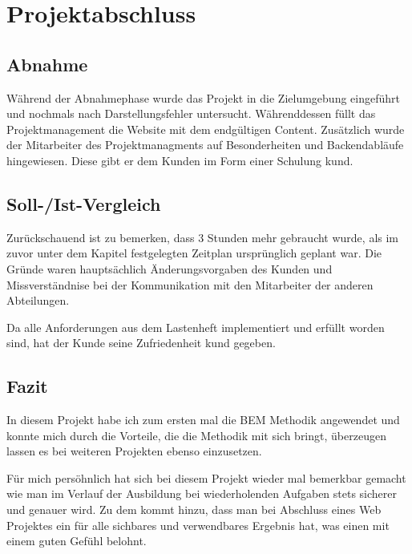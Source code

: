\section{Projektabschluss} 
\label{sec:Projektabschluss}

\subsection{Abnahme} 
\label{sec:Abnahme}
Während der Abnahmephase wurde das Projekt in die Zielumgebung eingeführt und
nochmals nach Darstellungsfehler untersucht. Währenddessen füllt das
Projektmanagement die Website mit dem endgültigen Content. Zusätzlich wurde der
Mitarbeiter des Projektmanagments auf Besonderheiten und Backendabläufe
hingewiesen. Diese gibt er dem Kunden im Form einer Schulung kund.

\subsection{Soll-/Ist-Vergleich}
\label{sec:SollIstVergleich}

Zurückschauend ist zu bemerken, dass 3 Stunden mehr gebraucht wurde,
als im zuvor unter dem Kapitel  festgelegten Zeitplan
ursprünglich geplant war.
Die Gründe waren hauptsächlich Änderungsvorgaben des Kunden und Missverständnise
bei der Kommunikation mit den Mitarbeiter der anderen Abteilungen. 


Da alle Anforderungen aus dem Lastenheft implementiert und erfüllt worden sind,
hat der Kunde seine Zufriedenheit kund gegeben.


\subsection{Fazit} 
\label{sec:Fazit}

In diesem Projekt habe ich zum ersten mal die \ac{BEM} Methodik angewendet und
konnte mich durch die Vorteile, die die Methodik mit sich bringt, überzeugen
lassen es bei weiteren Projekten ebenso einzusetzen.

Für mich persöhnlich hat sich bei diesem Projekt wieder mal bemerkbar gemacht
wie man im Verlauf der Ausbildung bei wiederholenden Aufgaben stets sicherer und genauer wird. Zu dem
kommt hinzu, dass man bei Abschluss eines Web Projektes ein für alle sichbares
und verwendbares Ergebnis hat, was einen mit einem guten Gefühl belohnt.

